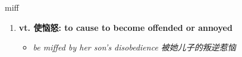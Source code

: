 
\begin{frame}
{\huge miff}
\begin{center}
\begin{enumerate}\Large
  \item \textbf{vt. 使恼怒: to cause to become offended or annoyed}
  \begin{itemize}
    \item \em{\Large{be miffed by her son’s disobedience 被她儿子的叛逆惹恼}}
  \end{itemize}
\end{enumerate}
\end{center}
\end{frame}
